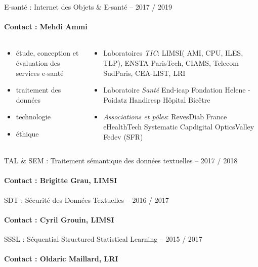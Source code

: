 \begin{frame}{ E-santé : Internet des Objets \& E-santé – 2017 / 2019}
\framesubtitle{Contact : Mehdi Ammi}
\vspace*{-1cm}
{\color{blue} }


\begin{columns}
  \begin{column}{6cm}
    \begin{itemize}
    \item étude, conception et évaluation des services e-santé
    \item traitement des données
    \item technologie
    \item éthique
    \end{itemize}
  \end{column}
  \begin{column}{7cm}
    \begin{itemize}
    \item
      Laboratoires \textit{TIC}:
      LIMSI( AMI, CPU, ILES, TLP),
      ENSTA ParisTech,
      CIAMS,
      Telecom SudParis,
      CEA-LIST,
      LRI
    \item
      Laboratoire \textit{Santé}
      End-icap
      Fondation Helene - Poidatz
      Handiresp
      Hôpital Bicêtre 
    \item
      \textit{Associations et pôles}:
      RevesDiab
      France eHealthTech
      Systematic
      Capdigital
      OpticsValley
      Fedev (SFR)
    \end{itemize}
  \end{column}
\end{columns}
\end{frame}


\begin{frame}{ TAL \& SEM : Traitement sémantique des données textuelles – 2017 / 2018}
\framesubtitle{Contact : Brigitte Grau, LIMSI}
\end{frame}

\begin{frame}{SDT : Sécurité des Données Textuelles – 2016 / 2017}
\framesubtitle{Contact : Cyril Grouin, LIMSI}
\end{frame}

\begin{frame}{SSSL : Séquential Structured Statistical Learning – 2015 / 2017}
\framesubtitle{Contact : Oldaric Maillard, LRI}
\end{frame}
